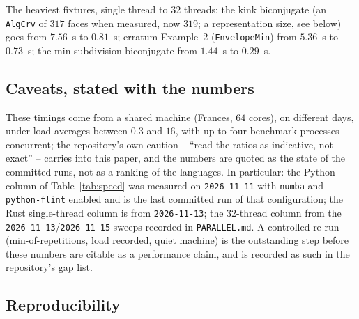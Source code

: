 \documentclass[11pt]{article}
\theoremstyle{definition}
\begin{document}
The heaviest fixtures, single thread to $32$ threads:
the kink biconjugate (an \texttt{AlgCrv} of $317$ faces when measured, now $319$; a representation size,
see below) goes from $7.56$~s to
$0.81$~s; erratum Example~2 (\texttt{EnvelopeMin}) from $5.36$~s to $0.73$~s;
the min-subdivision biconjugate from $1.44$~s to $0.29$~s.

\subsection{Caveats, stated with the numbers}

These timings come from a shared machine (Frances, $64$ cores), on different
days, under load averages between $0.3$ and $16$, with up to four benchmark
processes concurrent; the repository's own caution -- ``read the ratios as
indicative, not exact'' -- carries into this paper, and the numbers are quoted
as the state of the committed runs, not as a ranking of the languages.
 In particular: the Python column of Table~\ref{tab:speed} was measured
on \texttt{2026-11-11} with \texttt{numba} and \texttt{python-flint} enabled
and is the last committed run of that configuration; the Rust single-thread
column is from \texttt{2026-11-13}; the $32$-thread column from the
\texttt{2026-11-13}/\texttt{2026-11-15} sweeps recorded in \texttt{PARALLEL.md}.
 A controlled re-run
(min-of-repetitions, load recorded, quiet machine) is the outstanding step
before these numbers are citable as a performance claim, and is recorded as
such in the repository's gap list.


\subsection{Reproducibility}
\end{document}
